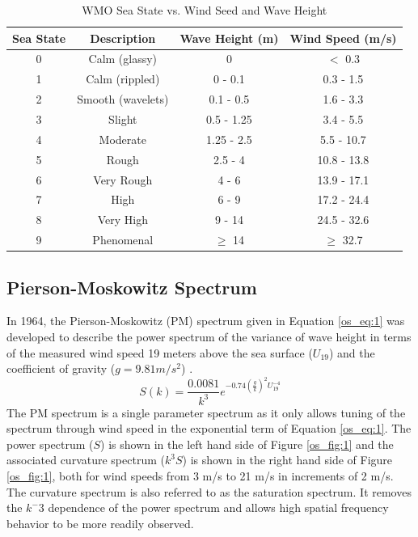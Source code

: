 \begin{table}[H]
  \begin{center}
      \renewcommand{\baselinestretch}{1} \small\normalsize
  \begin{quote}
    \caption[WMO Sea State vs. Wind Speed and Wave Height]{WMO Sea State vs. Wind Seed and Wave Height\label{os_tab:0}}
  \end{quote}
  \begin{tabular} {|c | c | c| c|}
    \hline
  \bf{Sea State} & \bf{Descriptio}n & \bf{Wave Height (m)} & \bf{Wind Speed (m/s)}\\ \hline
  0 & Calm (glassy) & 0 & $<$ 0.3 \\ \hline
  1 & Calm (rippled) & 0 - 0.1 & 0.3 - 1.5 \\ \hline
  2 & Smooth (wavelets) & 0.1 - 0.5 & 1.6 - 3.3 \\ \hline
  3 & Slight & 0.5 - 1.25 & 3.4 - 5.5 \\ \hline
  4 & Moderate & 1.25 - 2.5 & 5.5 - 10.7 \\ \hline
  5 & Rough & 2.5 - 4 & 10.8 - 13.8 \\ \hline
  6 & Very Rough & 4 - 6 & 13.9 - 17.1\\ \hline
  7 & High & 6 - 9 & 17.2 - 24.4\\ \hline
  8 & Very High & 9 - 14 & 24.5 - 32.6\\ \hline
  9 & Phenomenal & $\geq$ 14 & $\geq$ 32.7\\ \hline
\end{tabular}
\end{center}
\end{table}
\renewcommand{\baselinestretch}{2} \small\normalsize

\subsection{Pierson-Moskowitz Spectrum}
In 1964, the Pierson-Moskowitz (PM) spectrum given in Equation \ref{os_eq:1} was developed to describe the power spectrum of the variance of wave height in terms of the measured wind speed 19 meters above the sea surface ($U_{19}$) and the coefficient of gravity ($g=9.81 m/s^2$) \cite{michel_sea_spectra}. 
 \begin{equation}
S(k) = \frac{0.0081}{k^3}e^{-0.74\left(\frac{g}{k}\right)^2U_{19}^{-4}}
\label{os_eq:1}
\end{equation}
 \renewcommand{\baselinestretch}{2} \small\normalsize
The PM spectrum is a single parameter spectrum as it only allows tuning of the spectrum through wind speed in the exponential term of Equation \ref{os_eq:1}. The power spectrum ($S$) is shown in the left hand side of Figure \ref{os_fig:1} and the associated curvature spectrum ($k^3S$) is shown in the right hand side of Figure \ref{os_fig:1}, both for wind speeds from 3 m/s to 21 m/s in increments of 2 m/s. The curvature spectrum is also referred to as the saturation spectrum. It removes the $k^-3$ dependence of the power spectrum and allows high spatial frequency behavior to be more readily observed.
 

